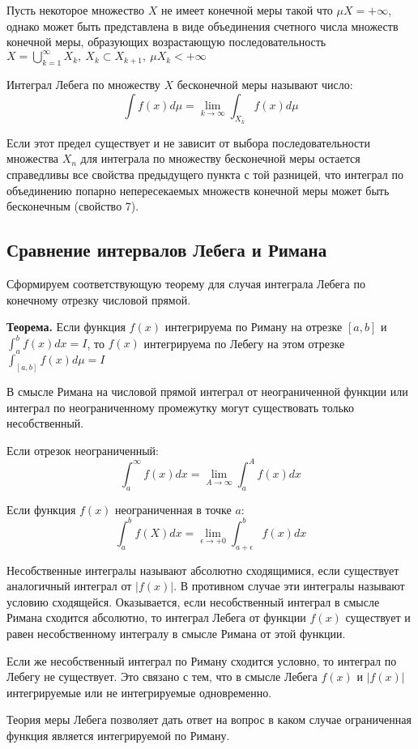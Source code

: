 \documentclass[14pt,a4paper]{extarticle}
\theoremstyle{definition}
\theoremstyle{remark}
\renewcommand{\[}{\begin{dmath*}[compact]}
\renewcommand{\]}{\end{dmath*}}
\newcommand{\sep}{ , \ \allowbreak }
\newcommand{\tth}[1][]{\textbf{Теорема#1.}}
\begin{document}
Пусть некоторое множество $X$ не имеет конечной меры такой что $\mu X = + \infty$, однако может быть представлена в виде объединения счетного числа множеств конечной меры, образующих возрастающую последовательность $X= \bigcup_{k=1}^\infty X_k \sep X_k \subset X_{k+1} \sep \mu X_k <+ \infty$

Интеграл Лебега по множеству $X$ бесконечной меры называют число:
\[\int f(x) d\mu = \lim_{k \to \infty} \int_{X_k}f(x) d \mu\]

Если этот предел существует и не зависит от выбора последовательности множества $X_n$ для интеграла по множеству бесконечной меры остается справедливы все свойства предыдущего пункта с той разницей, что интеграл по объединению попарно непересекаемых множеств конечной меры может быть бесконечным (свойство 7).

\subsection{Сравнение интервалов Лебега и Римана}

Сформируем соответствующую теорему для случая интеграла Лебега по конечному отрезку числовой прямой.

\tth[] Если функция $f(x)$ интегрируема по Риману на отрезке $[a,b]$ и $\int_a^b f(x) dx = I$, то $f(x)$ интегрируема по Лебегу на этом отрезке $\int_{[a,b]} f(x) d \mu = I$

В смысле Римана на числовой прямой интеграл от неограниченной функции или интеграл по неограниченному промежутку могут существовать только несобственный.

Если отрезок неограниченный:
\[\int_a^\infty f(x)dx = \lim_{A \to \infty} \int_a^A f(x) dx\]

Если функция $f(x)$ неограниченная в точке $a$:
\[\int_a^b f(X)dx = \lim_{\epsilon \to +0} \int_{a+\epsilon}^b f(x) dx\]

Несобственные интегралы называют абсолютно сходящимися, если существует аналогичный интеграл от $|f(x)|$. В противном случае эти интегралы называют условию сходящейся. Оказывается, если несобственный интеграл в смысле Римана сходится абсолютно, то интеграл Лебега от функции $f(x)$ существует и равен несобственному интегралу в смысле Римана от этой функции.

Если же несобственный интеграл по Риману сходится условно, то интеграл по Лебегу не существует. Это связано с тем, что в смысле Лебега $f(x)$ и $|f(x)|$ интегрируемые или не интегрируемые одновременно.

Теория меры Лебега позволяет дать ответ на вопрос в каком случае ограниченная функция является интегрируемой по Риману.
\end{document}
